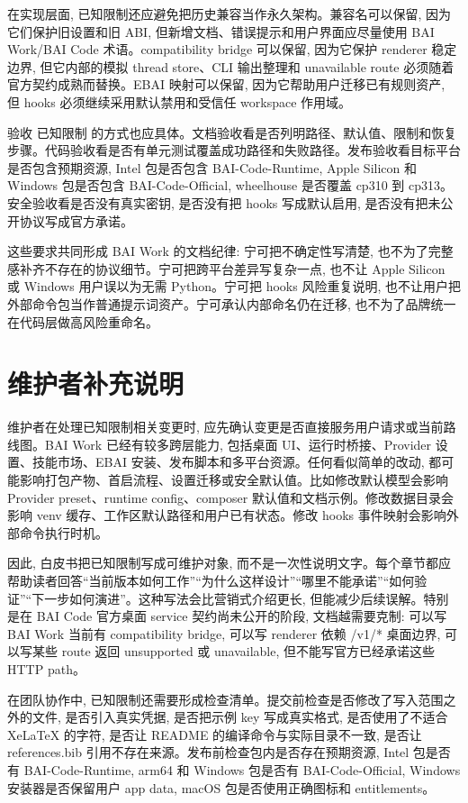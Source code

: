 在实现层面, 已知限制还应避免把历史兼容当作永久架构。兼容名可以保留, 因为它们保护旧设置和旧 ABI, 但新增文档、错误提示和用户界面应尽量使用 BAI Work/BAI Code 术语。compatibility bridge 可以保留, 因为它保护 renderer 稳定边界, 但它内部的模拟 thread store、CLI 输出整理和 unavailable route 必须随着官方契约成熟而替换。EBAI 映射可以保留, 因为它帮助用户迁移已有规则资产, 但 hooks 必须继续采用默认禁用和受信任 workspace 作用域。

验收 已知限制 的方式也应具体。文档验收看是否列明路径、默认值、限制和恢复步骤。代码验收看是否有单元测试覆盖成功路径和失败路径。发布验收看目标平台是否包含预期资源, Intel 包是否包含 BAI-Code-Runtime, Apple Silicon 和 Windows 包是否包含 BAI-Code-Official, wheelhouse 是否覆盖 cp310 到 cp313。安全验收看是否没有真实密钥, 是否没有把 hooks 写成默认启用, 是否没有把未公开协议写成官方承诺。

这些要求共同形成 BAI Work 的文档纪律: 宁可把不确定性写清楚, 也不为了完整感补齐不存在的协议细节。宁可把跨平台差异写复杂一点, 也不让 Apple Silicon 或 Windows 用户误以为无需 Python。宁可把 hooks 风险重复说明, 也不让用户把外部命令包当作普通提示词资产。宁可承认内部命名仍在迁移, 也不为了品牌统一在代码层做高风险重命名。

\section{维护者补充说明}

维护者在处理已知限制相关变更时, 应先确认变更是否直接服务用户请求或当前路线图。BAI Work 已经有较多跨层能力, 包括桌面 UI、运行时桥接、Provider 设置、技能市场、EBAI 安装、发布脚本和多平台资源。任何看似简单的改动, 都可能影响打包产物、首启流程、设置迁移或安全默认值。比如修改默认模型会影响 Provider preset、runtime config、composer 默认值和文档示例。修改数据目录会影响 venv 缓存、工作区默认路径和用户已有状态。修改 hooks 事件映射会影响外部命令执行时机。

因此, 白皮书把已知限制写成可维护对象, 而不是一次性说明文字。每个章节都应帮助读者回答“当前版本如何工作”“为什么这样设计”“哪里不能承诺”“如何验证”“下一步如何演进”。这种写法会比营销式介绍更长, 但能减少后续误解。特别是在 BAI Code 官方桌面 service 契约尚未公开的阶段, 文档越需要克制: 可以写 BAI Work 当前有 compatibility bridge, 可以写 renderer 依赖 /v1/* 桌面边界, 可以写某些 route 返回 unsupported 或 unavailable, 但不能写官方已经承诺这些 HTTP path。

在团队协作中, 已知限制还需要形成检查清单。提交前检查是否修改了写入范围之外的文件, 是否引入真实凭据, 是否把示例 key 写成真实格式, 是否使用了不适合 XeLaTeX 的字符, 是否让 README 的编译命令与实际目录不一致, 是否让 references.bib 引用不存在来源。发布前检查包内是否存在预期资源, Intel 包是否有 BAI-Code-Runtime, arm64 和 Windows 包是否有 BAI-Code-Official, Windows 安装器是否保留用户 app data, macOS 包是否使用正确图标和 entitlements。

